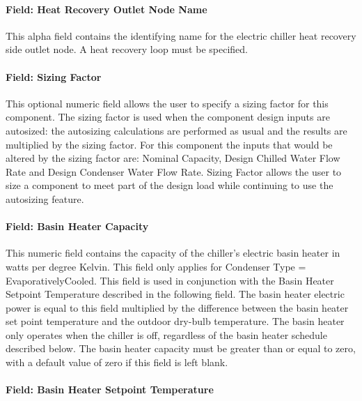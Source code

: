 \paragraph{Field: Heat Recovery Outlet Node Name}\label{field-heat-recovery-outlet-node-name-000}

This alpha field contains the identifying name for the electric chiller heat recovery side outlet node. A heat recovery loop must be specified.

\paragraph{Field: Sizing Factor}\label{field-sizing-factor-3-000}

This optional numeric field allows the user to specify a sizing factor for this component. The sizing factor is used when the component design inputs are autosized: the autosizing calculations are performed as usual and the results are multiplied by the sizing factor. For this component the inputs that would be altered by the sizing factor are: Nominal Capacity, Design Chilled Water Flow Rate and Design Condenser Water Flow Rate. Sizing Factor allows the user to size a component to meet part of the design load while continuing to use the autosizing feature.

\paragraph{Field: Basin Heater Capacity}\label{field-basin-heater-capacity-1-001}

This numeric field contains the capacity of the chiller's electric basin heater in watts per degree Kelvin. This field only applies for Condenser Type = EvaporativelyCooled. This field is used in conjunction with the Basin Heater Setpoint Temperature described in the following field. The basin heater electric power is equal to this field multiplied by the difference between the basin heater set point temperature and the outdoor dry-bulb temperature. The basin heater only operates when the chiller is off, regardless of the basin heater schedule described below. The basin heater capacity must be greater than or equal to zero, with a default value of zero if this field is left blank.

\paragraph{Field: Basin Heater Setpoint Temperature}\label{field-basin-heater-setpoint-temperature-1-001}

